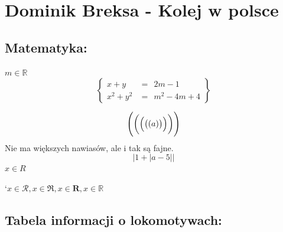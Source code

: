 
\newpage
\section{Dominik Breksa - Kolej w polsce}


\subsection{Matematyka:}
$m\in\mathbb{R}$
\[
\left\{
\begin{array}{rl}
x+y &=\:\:2m-1 \\
x^2+y^2&=\:\: m^2-4m+4
\end{array}
\right\}
\]

\begin{center}
    
     $$\Biggl(\biggl(\Bigl(\bigl(( a )\bigr)\Bigr)\biggr)\Biggr)$$
    Nie ma większych nawiasów, ale i tak są fajne.
     $$\left|1+\right|a-5||$$
    $ x\in R$

   `$ x\in\mathcal{R},   x\in\mathfrak{R},  x\in\mathbf{R},   x\in\mathbb{R}$

\end{center}


\subsection{Tabela informacji o lokomotywach:}

\newpage


